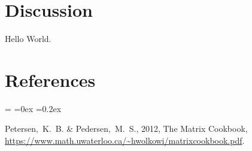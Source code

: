 \documentclass[12pt]{article}
\begin{document}
\clearpage
\section{Discussion}

Hello World.

\clearpage
\section*{References}
\begin{list}{}{%
    \rightmargin=0in
    \leftmargin=\parindent
    \topsep=0ex
    \partopsep=0pt
    \itemsep=0.2ex
    \parsep=0pt
    \leftmargin
    \leftmargin}
\item Petersen,~K.~B. \& Pedersen,~M.~S., 2012, The Matrix Cookbook, \url{https://www.math.uwaterloo.ca/~hwolkowi/matrixcookbook.pdf}.
\end{list}
\end{document}
